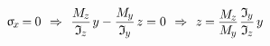 \documentclass[14pt]{extarticle}
\begin{document}
\[
\upsigma_{\hspace{-0.2ex}\scalebox{.8}{$x$}} \hspace{-0.2ex}
=\hspace{-.1ex} 0
\hspace{.4em}\Rightarrow\hspace{.4em}
\displaystyle\frac{M_{\hspace{-0.1ex}\scalebox{.8}{$z$}}}{\mathfrak{I}_{\hspace{-0.1ex}\scalebox{.8}{$z$}}} \hspace{.25ex} y
- \displaystyle\frac{M_{\hspace{-0.1ex}\scalebox{.8}{$y$}}}{\mathfrak{I}_{\hspace{-0.1ex}\scalebox{.8}{$y$}}} \hspace{.25ex} z
= 0
\hspace{.4em}\Rightarrow\hspace{.4em}
z \hspace{-.1ex}=\hspace{-.1ex}
\displaystyle\frac{\raisebox{-0.12em}{$M_{\hspace{-0.1ex}\scalebox{.8}{$z$}}$}}{M_{\hspace{-0.1ex}\scalebox{.8}{$y$}}} \hspace{.2ex}
\displaystyle\frac{\mathfrak{I}_{\hspace{-0.1ex}\scalebox{.8}{$y$}}}{\mathfrak{I}_{\hspace{-0.1ex}\scalebox{.8}{$z$}}}
\hspace{.3ex} y
\]
\end{document}
